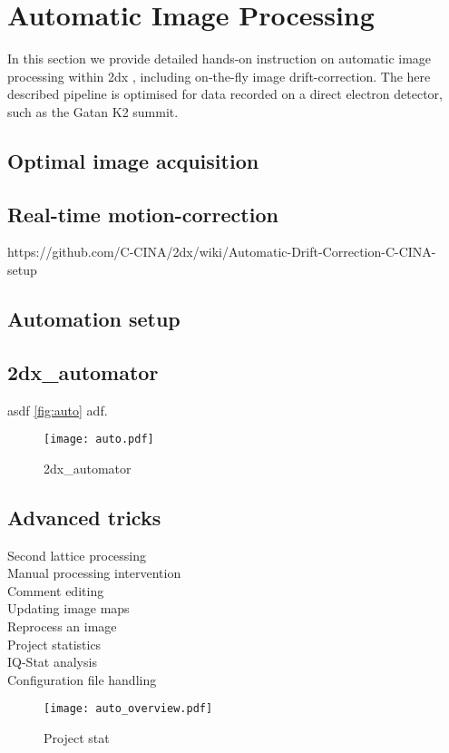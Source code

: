 \section{Automatic Image Processing}

In this section we provide detailed hands-on instruction on automatic image processing within 2dx \cite{scherer20142dx_automator}, including on-the-fly image drift-correction. The here described pipeline is optimised for data recorded on a direct electron detector, such as the Gatan K2 summit. 

\subsection{Optimal image acquisition}

\subsection{Real-time motion-correction}

https://github.com/C-CINA/2dx/wiki/Automatic-Drift-Correction-C-CINA-setup

\subsection{Automation setup}

\subsection{2dx\_automator}

asdf  \autoref{fig:auto} adf.

\begin{figure}
	\centering
	\texttt{[image: auto.pdf]}
	\caption{2dx\_automator}
	\label{fig:auto}
\end{figure}


\subsection{Advanced tricks}

\begin{description}
	\item [Second lattice processing]
	\item [Manual processing intervention] 
	\item [Comment editing]
	\item [Updating image maps]
	\item [Reprocess an image]
	\item [Project statistics]
	\item [IQ-Stat analysis]
	\item [Configuration file handling] 
\end{description}



\begin{figure}
	\centering
	\texttt{[image: auto\_overview.pdf]}
	\caption{Project stat}
	\label{fig:auto_stat}
\end{figure}